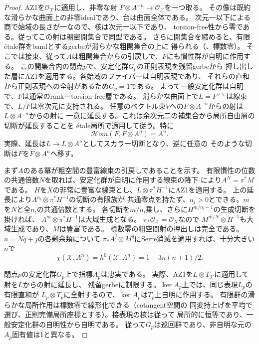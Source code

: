 \documentclass[11pt,a4paper]{ltjsarticle}
\theoremstyle{definition}
\begin{document}
\begin{proof}
AZ1を$\mathcal O_{\mathcal X}$に適用し、非零な射
$F\otimes A^{-n}\to\mathcal O_{\mathcal X}$を一つ取る。
その像は既約な滑らかな曲面上の非零idealであり、台は曲面全体である。
次元一以下による商で始域の長さが一なので、核は次元一以下であり、
torsion-free性から零である。従ってこの射は稠密開集合で同型である。
さらに開集合を縮めると、有限étale群をbandとするgerbeが滑らかな粗開集合の上に
得られる（\cite[Tag 06RC]{StacksProject}、標数零）。
そこでは接束、従って$A$は粗開集合からの引戻しで、$F$にも慣性群が自明に作用する。
この開集合内の閉点$p$で、安定化群$G_p$の正則表現を残留gerbeから
押し出した層にAZ1を適用する。各始域のファイバーは自明表現であり、
それらの直和から正則表現への全射があるため$G_p=1$である。
よって一般安定化群は自明で、$F$は通常のrank一torsion-free層である。
滑らかな曲面上で$L=F^{\vee\vee}$は線束で、$L/F$は零次元に支持される。
任意のベクトル束$V$への$F\otimes A^{-n}$からの射は$L\otimes A^{-n}$からの射に
一意に延長する。これは余次元二の補集合から局所自由層の切断が延長することを
étale局所で適用して従う。特に
\[
 \mathcal H om(F,F\otimes A^n)=A^n .
\]
実際、延長は$L\to L\otimes A^n$としてスカラー切断となり、逆に任意の
そのような切断は$F$を$F\otimes A^n$へ移す。

まず$A$のある冪が粗空間の豊富線束の引戻しであることを示す。
有限慣性の位数の共通倍数$N$を取れば、安定化群が自明に作用する線束の降下
\cite[Theorem~10.3]{Alper2013}により$A^N=\pi^*M$である。
$H$を$X$の非常に豊富な線束とし、$L\otimes\pi^*H^{-1}$にAZ1を適用する。
上の延長により$A^{n_i}\otimes\pi^*H^{-1}$の切断の有限族が
共通零点を持たず、$n_i>0$とできる。$m$を$N$と全$n_i$の共通倍数とする。
各切断を$m/n_i$乗し、さらに$H^{m/n_i-1}$の生成切断を掛ければ、
$A^m\otimes\pi^*H^{-1}$は大域生成となる。
$\pi_*\mathcal O_{\mathcal X}=\mathcal O_X$なので
$M^{m/N}\otimes H^{-1}$も大域生成であり、$M$は豊富である。
標数零の粗空間射の押出しは完全である。$n=Nq+j$の各剰余類について
$\pi_*A^j\otimes M^q$にSerre消滅を適用すれば、十分大きい$n$で
\[
 \chi(\mathcal X,A^n)=h^0(\mathcal X,A^n)=1+3n(n+1)/2 .
\]

閉点$p$の安定化群$G_p$上で指標$A_p$は忠実である。
実際、AZ1を$L\otimes T_{\mathcal X}$に適用して射を$L$からの射に延長し、
残留gerbeに制限する。$\ker A_p$上では、同じ表現$L_p$の有限直和が
$L_p\otimes T_p$に全射するので、$\ker A_p$は$T_p$上自明に作用する。
有限群の滑らかな局所作用は標数零で線形化できる（cotangent空間の
同変持上げを平均で選び、正則完備局所座標とする）。接表現の核は従って
局所的に恒等であり、一般安定化群の自明性から自明である。
従って$G_p$は巡回群であり、非自明な元の$A_p$固有値は1と異なる。


\end{proof}
\end{document}
